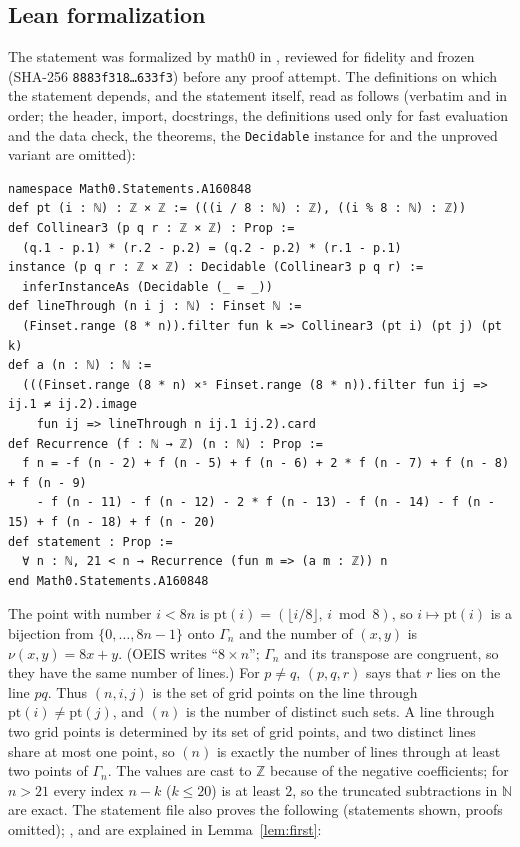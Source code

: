 \documentclass[11pt]{amsart}
\theoremstyle{plain}
\theoremstyle{definition}
\newcommand{\N}{\mathbb{N}}
\newcommand{\Z}{\mathbb{Z}}
\begin{document}
\subsection*{Lean formalization}
The statement was formalized by math0 in , reviewed for fidelity and frozen (SHA-256 \texttt{8883f318\ldots 633f3}) before any proof attempt. The definitions on which the statement depends, and the statement itself, read as follows (verbatim and in order; the header, import, docstrings, the definitions used only for fast evaluation and the data check, the theorems, the \texttt{Decidable} instance for  and the unproved variant  are omitted):
\begin{lstlisting}
namespace Math0.Statements.A160848
def pt (i : ℕ) : ℤ × ℤ := (((i / 8 : ℕ) : ℤ), ((i % 8 : ℕ) : ℤ))
def Collinear3 (p q r : ℤ × ℤ) : Prop :=
  (q.1 - p.1) * (r.2 - p.2) = (q.2 - p.2) * (r.1 - p.1)
instance (p q r : ℤ × ℤ) : Decidable (Collinear3 p q r) :=
  inferInstanceAs (Decidable (_ = _))
def lineThrough (n i j : ℕ) : Finset ℕ :=
  (Finset.range (8 * n)).filter fun k => Collinear3 (pt i) (pt j) (pt k)
def a (n : ℕ) : ℕ :=
  (((Finset.range (8 * n) ×ˢ Finset.range (8 * n)).filter fun ij => ij.1 ≠ ij.2).image
    fun ij => lineThrough n ij.1 ij.2).card
def Recurrence (f : ℕ → ℤ) (n : ℕ) : Prop :=
  f n = -f (n - 2) + f (n - 5) + f (n - 6) + 2 * f (n - 7) + f (n - 8) + f (n - 9)
    - f (n - 11) - f (n - 12) - 2 * f (n - 13) - f (n - 14) - f (n - 15) + f (n - 18) + f (n - 20)
def statement : Prop :=
  ∀ n : ℕ, 21 < n → Recurrence (fun m => (a m : ℤ)) n
end Math0.Statements.A160848
\end{lstlisting}
The point with number $i<8n$ is $\mathrm{pt}(i)=(\lfloor i/8\rfloor,\,i\bmod 8)$, so $i\mapsto\mathrm{pt}(i)$ is a bijection from $\{0,\dots,8n-1\}$ onto $\Gamma_n$ and the number of $(x,y)$ is $\nu(x,y)=8x+y$. (OEIS writes ``$8\times n$''; $\Gamma_n$ and its transpose are congruent, so they have the same number of lines.) For $p\ne q$, $(p,q,r)$ says that $r$ lies on the line $pq$. Thus $(n,i,j)$ is the set of grid points on the line through $\mathrm{pt}(i)\ne\mathrm{pt}(j)$, and $(n)$ is the number of distinct such sets. A line through two grid points is determined by its set of grid points, and two distinct lines share at most one point, so $(n)$ is exactly the number of lines through at least two points of $\Gamma_n$. The values are cast to $\Z$ because of the negative coefficients; for $n>21$ every index $n-k$ ($k\le20$) is at least $2$, so the truncated subtractions in $\N$ are exact. The statement file also proves the following (statements shown, proofs omitted); ,  and  are explained in Lemma~\ref{lem:first}:
\end{document}
